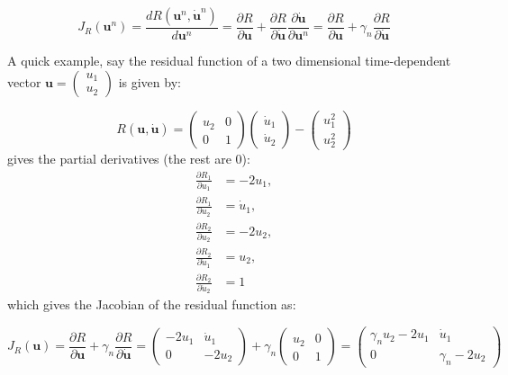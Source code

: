 \begin{equation}
    J_R(\mathbf{u}^n) = \frac{dR(\mathbf{u}^{n}, \dot{\mathbf{u}}^{n})}{d\mathbf{u}^{n}} = \frac{\partial R}{\partial \mathbf{u}} + \frac{\partial R}{\partial \dot{\mathbf{u}}} \frac{\partial \dot{\mathbf{u}}}{\partial \mathbf{u}^{n}} = \frac{\partial R}{\partial \mathbf{u}} + \gamma_n \frac{\partial R}{\partial \dot{\mathbf{u}}}
\end{equation}

A quick example, say the residual function of a two dimensional time-dependent vector $\mathbf{u} = \begin{pmatrix}u_1 \\ u_2 \end{pmatrix}$ is given by:

\begin{equation}
    R(\mathbf{u},\dot{\mathbf{u}}) = \begin{pmatrix}u_2 & 0 \\ 0 & 1\end{pmatrix}\begin{pmatrix}\dot{u}_1 \\ \dot{u}_2\end{pmatrix} - \begin{pmatrix}u_1^2 \\ u_2^2\end{pmatrix}
\end{equation}
gives the partial derivatives (the rest are $0$):
\begin{equation}
    \begin{aligned}
        \frac{\partial R_1}{\partial u_1} & = -2u_1, \\
        \frac{\partial R_1}{\partial u_2} & = \dot{u}_1, \\
        \frac{\partial R_2}{\partial u_2} & = -2u_2, \\
        \frac{\partial R_2}{\partial \dot{u}_1} & = u_2, \\
        \frac{\partial R_2}{\partial \dot{u}_2} & = 1
    \end{aligned}
\end{equation}
which gives the Jacobian of the residual function as:


\begin{equation}
    J_R(\mathbf{u}) = \frac{\partial R}{\partial \mathbf{u}} + \gamma_n \frac{\partial R}{\partial \dot{\mathbf{u}}} = \begin{pmatrix} -2u_1 & \dot{u}_1 \\ 0 & -2u_2 \end{pmatrix} + \gamma_n \begin{pmatrix} u_2 & 0 \\ 0 & 1 \end{pmatrix} = \begin{pmatrix} \gamma_n u_2 - 2u_1 & \dot{u}_1 \\ 0 & \gamma_n - 2u_2 \end{pmatrix}
\end{equation}

